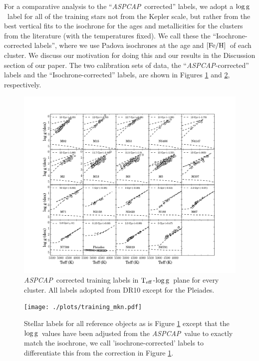 \documentclass[12pt, preprint]{aastex}
\newcommand{\teff}{\mbox{$\rm T_{eff}$}}
\newcommand{\feh}{\mbox{$\rm [Fe/H]$}}
\newcommand{\logg}{\mbox{$\rm \log g$}}
\newcommand{\aspcap}{\textsl{ASPCAP}}
\begin{document}
For a comparative analysis to the ``\aspcap\ corrected'' labels, we adopt a \logg\ label for all of the training stars not from the Kepler scale, but rather from the best vertical fits to the isochrone for the ages and metallicities for the clusters from the literature (with the temperatures fixed). We call these the ``Isochrone-corrected labels'', where we use Padova isochrones at the age and \feh\ of each cluster. We discuss our motivation for doing this and our results in the Discussion section of our paper.  The two calibration sets of data, the ``\aspcap-corrected'' labels and the ``Isochrone-corrected'' labels, are shown in Figures \ref{fig:trainingaspcap} and \ref{fig:trainingisochrone}, respectively. 

\begin{figure}[h!]
\centering
    \includegraphics[scale=0.33]{./plots/training_aspcap.pdf}
\caption{\aspcap\ corrected training labels in \teff-\logg\ plane for every cluster. All labels adopted from DR10 except for the Pleiades. }
\label{fig:trainingaspcap}
\end{figure}

\begin{figure}[h!]
\centering
  \texttt{[image: ./plots/training\_mkn.pdf]}
\caption{Stellar labels for all reference objects as is Figure \ref{fig:trainingaspcap} except that the \logg\ values have been adjusted from the \aspcap\ value to exactly match the isochrone, we call  'isochrone-corrected' labels to differentiate this from the correction in Figure \ref{fig:trainingaspcap}.  }
\label{fig:trainingisochrone}
\end{figure}
\end{document}
